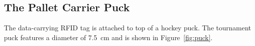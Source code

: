 \documentclass[12pt,twoside]{article}
\begin{document}




\subsection{The Pallet Carrier Puck}
The data-carrying RFID tag is attached to top of a hockey puck. The tournament
puck features a diameter of \SI{7.5}{\centi\metre} and is shown in Figure~\ref{fig:puck}.

\end{document}
